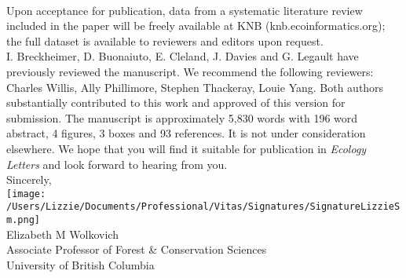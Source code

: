 \documentclass[12pt,a4paper]{letter}
\begin{document}
\begin{letter}{}
\vspace{1.5ex}\\
Upon acceptance for publication, data from a systematic literature review included in the paper will be freely available at KNB (knb.ecoinformatics.org); the full dataset is available to reviewers and editors upon request. %
\vspace{1.5ex}\\
I. Breckheimer, D. Buonaiuto, E. Cleland, J. Davies and G. Legault have previously reviewed the manuscript. We recommend the following reviewers: Charles Willis, Ally Phillimore, Stephen Thackeray, Louie Yang.  Both authors substantially contributed to this work and approved of this version for submission. The manuscript is approximately 5,830 words with 196 word abstract, 4 figures, 3 boxes and 93 references. It is not under consideration elsewhere. We hope that you will find it suitable for publication in \emph{Ecology Letters} and look forward to hearing from you.
\vspace{1.5ex}\\
Sincerely,\\

\texttt{[image: /Users/Lizzie/Documents/Professional/Vitas/Signatures/SignatureLizzieSm.png]} \\

Elizabeth M Wolkovich\\
Associate Professor of Forest \& Conservation Sciences\\ 
University of British Columbia
\end{letter}
\end{document}

